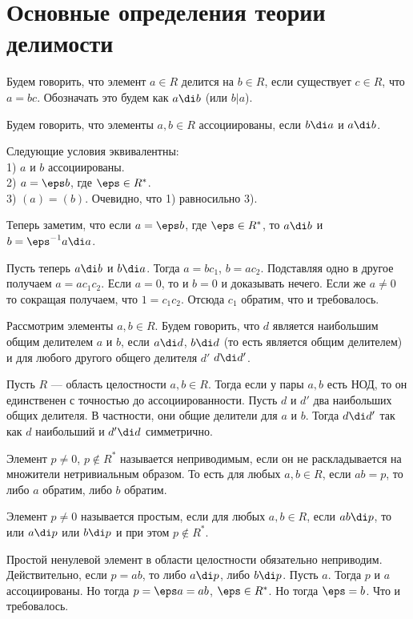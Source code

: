 \section{Основные определения теории делимости}

 Будем говорить, что элемент $a\in R$ делится на $b \in R$, если существует
$c \in R$, что $a=bc$. Обозначать это будем как $a\di b$ (или $b|a$).
\edfn

 Будем говорить, что элементы $a,b\in R$ ассоциированы, если $b\di a$ и $a \di b$.
\edfn

 Следующие условия эквивалентны:\\
1) $a$ и $b$ ассоциированы.\\
2) $a = \eps b$, где $\eps \in R^*$.\\
3) $(a) = (b)$.
\elm
\proof Очевидно, что 1) равносильно 3). 

Теперь заметим, что если $a = \eps b$, где $\eps \in R^*$, то $a\di b$ и $b=\eps^{-1}a \di a$. 

Пусть теперь $a\di b$ и $b\di a$. Тогда $a=bc_1$, $b=ac_2$. Подставляя одно в другое получаем $a=ac_1c_2$. Если $a=0$, то и $b=0$ и доказывать нечего. Если же $a\neq 0$ то сокращая получаем, что $1=c_1c_2$. Отсюда $c_1$ обратим, что и требовалось.
\endproof

\dfn[НОД] Рассмотрим элементы $a,b\in R$. Будем говорить, что $d$ является наибольшим общим делителем $a$ и $b$, если $a\di d$, $b\di d$ (то есть является общим делителем) и для любого другого общего делителя $d'$ $d\di d'$.
\edfn

 Пусть $R$ --- область целостности $a,b \in R$. Тогда если у пары $a,b$ есть НОД,
то он единственен с точностью до ассоциированности.
\elm
\proof
Пусть $d$ и $d'$ два наибольших общих делителя. В частности, они общие делители для $a$ и $b$. Тогда $d \di d'$ так как $d$ наибольший и $d' \di d$ симметрично.
\endproof

 Элемент $p\neq 0$, $p\notin R^*$ называется неприводимым, если он не раскладывается на множители нетривиальным образом. То есть для любых $a,b \in R$, если $ab=p$, то либо $a$ обратим, либо $b$ обратим.
\edfn

 Элемент $p\neq 0$ называется простым, если  для любых $a,b\in R$, если $ab\di p$, то или $a\di p$ или $b\di p$ и при этом $p\notin R^*$.
\edfn

\utv Простой ненулевой элемент в области целостности обязательно неприводим.
\proof Действительно, если $p=ab$, то либо $a\di p$, либо $b \di p$. Пусть $a$. Тогда $p$ и $a$ ассоциированы. Но тогда $p=\eps a=ab$, $\eps \in R^*$. Но тогда $\eps=b$. Что и требовалось.
\endproof
\eutv

